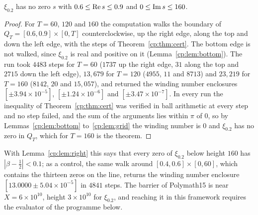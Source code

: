 \begin{theorem}\label{cp:thm:rig}
$\xi_{0.2}$ has no zero $s$ with $0.6\le\operatorname{Re} s\le0.9$ and $0\le\operatorname{Im} s\le160$.
\end{theorem}

\begin{proof}
For $T=60$, $120$ and $160$ the computation walks the boundary of $Q_T=[0.6,0.9]\times[0,T]$ counterclockwise, up the right edge, along the top and down the left edge, with the steps of Theorem~\ref{cp:thm:cert}. The bottom edge is not walked, since $\xi_{0.2}$ is real and positive on it (Lemma~\ref{cp:lem:bottom}). The run took $4483$ steps for $T=60$ ($1737$ up the right edge, $31$ along the top and $2715$ down the left edge), $13{,}679$ for $T=120$ ($4955$, $11$ and $8713$) and $23{,}219$ for $T=160$ ($8142$, $20$ and $15{,}057$), and returned the winding number enclosures $[\pm3.94\times10^{-5}]$, $[\pm1.24\times10^{-6}]$ and $[\pm3.47\times10^{-7}]$. In every run the inequality of Theorem~\ref{cp:thm:cert} was verified in ball arithmetic at every step and no step failed, and the sum of the arguments lies within $\pi$ of $0$, so by Lemmas~\ref{cp:lem:bottom} to~\ref{cp:lem:grid} the winding number is $0$ and $\xi_{0.2}$ has no zero in $Q_T$, which for $T=160$ is the theorem.
\end{proof}

With Lemma~\ref{cp:lem:right} this says that every zero of $\xi_{0.2}$ below height $160$ has $|\beta-\frac12|<0.1$; as a control, the same walk around $[0.4,0.6]\times[0,60]$, which contains the thirteen zeros on the line, returns the winding number enclosure $[13.0000\pm5.04\times10^{-5}]$ in $4841$ steps. The barrier of Polymath15 is near $X=6\times10^{10}$, height $3\times10^{10}$ for $\xi_{0.2}$, and reaching it in this framework requires the evaluator of the programme below.
